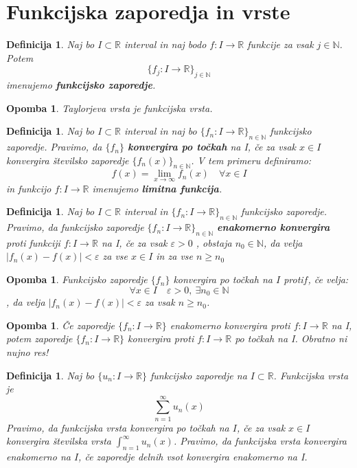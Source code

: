 \documentclass[11pt]{article}
\newtheorem{Definicija}[Izrek]{{\sc Definicija}}
\newtheorem{Opomba}[Izrek]{{\sc Opomba}}
\begin{document}
\section{Funkcijska zaporedja in vrste}
\begin{Definicija}
	Naj bo $I\subset \mathbb{R}$ interval in naj bodo $f: I \to \mathbb{R}$ funkcije za vsak $j \in \mathbb{N}$. Potem $$\{f_j: I\to \mathbb{R}\}_{j\in \mathbb{N}}$$ imenujemo \textbf{funkcijsko zaporedje}.
\end{Definicija}
\begin{Opomba}
	Taylorjeva vrsta je funkcijska vrsta.
\end{Opomba}
\begin{Definicija}
	Naj bo $I \subset \mathbb{R}$ interval in naj bo $\{f_n: I\to \mathbb{R}\}_{n\in \mathbb{N}}$ funkcijsko zaporedje. Pravimo, da $\{f_n\}$ \textbf{konvergira po točkah} na I, če za vsak $x\in I $ konvergira številsko zaporedje $\{f_n(x)\}_{n\in \mathbb{N}}$. V tem primeru definiramo: $$f(x) = \lim\limits_{x\to \infty}{f_n(x)} \quad \forall x\in I$$
	in funkcijo $f:I\to \mathbb{R}$ imenujemo\textbf{ limitna funkcija}.
\end{Definicija}
\begin{Definicija}
	Naj bo $I \subset \mathbb{R}$ interval in $\{f_n: I\to \mathbb{R}\}_{n\in \mathbb{N}}$ funkcijsko zaporedje. Pravimo, da funkcijsko zaporedje $\{f_n: I\to \mathbb{R}\}_{n\in \mathbb{N}}$ \textbf{enakomerno konvergira} proti funkciji $f: I \to \mathbb{R}$ na I, če za vsak $\varepsilon > 0$ , obstaja $n_0\in \mathbb{N}$, da velja $|f_n(x) -f(x)| <\varepsilon $ za vse $x\in I$ in za vse $n\ge n_0$
\end{Definicija}
\begin{Opomba}
	Funkcijsko zaporedje $\{f_n\}$ konvergira po točkah na $I$ proti$f$, če velja:
	$$\forall x\in I \quad \varepsilon > 0, \ \exists n_0\in\mathbb{N}$$, da velja $|f_n(x) -f(x)| < \varepsilon$ za vsak $n\ge n_0$.	
\end{Opomba}
\begin{Opomba}
	Če zaporedje $\{f_n : I\to \mathbb{R} \}$ enakomerno konvergira proti $f: I\to \mathbb{R}$ na I, potem zaporedje $\{f_n : I\to \mathbb{R} \}$ konvergira proti $f: I \to \mathbb{R}$ po točkah na I. Obratno ni nujno res!
\end{Opomba}
\begin{Definicija}
	Naj bo $\{u_n : I \to \mathbb{R} \}$ funkcijsko zaporedje na $I\subset \mathbb{R}$. Funkcijska vrsta je $$\sum_{n = 1}^{\infty}{u_n(x)}$$
	Pravimo, da funkcijska vrsta konvergira po točkah  na $I$, če za vsak $x\in I$ konvergira številska vrsta $\int_{n=1}^{\infty}{u_n(x)}$. Pravimo, da funkcijska vrsta konvergira enakomerno na $I$, če zaporedje delnih vsot konvergira enakomerno na I.
\end{Definicija}
\end{document}
